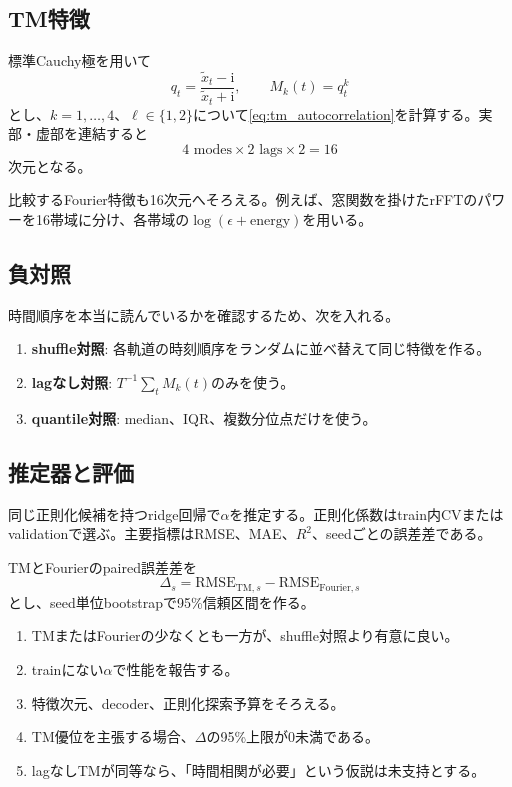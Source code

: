 \documentclass[a4paper,11pt,oneside,openany]{ltjsbook}
\newcommand{\ii}{\mathrm{i}}
\begin{document}
\subsection{TM特徴}

標準Cauchy極を用いて
\begin{equation}
  q_t=\frac{\widetilde x_t-\ii}{\widetilde x_t+\ii},
  \qquad M_k(t)=q_t^k
  \label{eq:e1_tm_modes}
\end{equation}
とし、\(k=1,\dots,4\)、\(\ell\in\{1,2\}\)について\cref{eq:tm_autocorrelation}を計算する。実部・虚部を連結すると
\begin{equation}
  4\text{ modes}\times2\text{ lags}\times2
  =16
  \label{eq:e1_tm_dim}
\end{equation}
次元となる。

比較するFourier特徴も16次元へそろえる。例えば、窓関数を掛けたrFFTのパワーを16帯域に分け、各帯域の\(\log(\epsilon+\text{energy})\)を用いる。

\subsection{負対照}

時間順序を本当に読んでいるかを確認するため、次を入れる。

\begin{enumerate}
  \item \textbf{shuffle対照}: 各軌道の時刻順序をランダムに並べ替えて同じ特徴を作る。
  \item \textbf{lagなし対照}: \(T^{-1}\sum_tM_k(t)\)のみを使う。
  \item \textbf{quantile対照}: median、IQR、複数分位点だけを使う。
\end{enumerate}

\subsection{推定器と評価}

同じ正則化候補を持つridge回帰で\(\alpha\)を推定する。正則化係数はtrain内CVまたはvalidationで選ぶ。主要指標はRMSE、MAE、\(R^2\)、seedごとの誤差差である。

TMとFourierのpaired誤差差を
\begin{equation}
  \Delta_s
  =\mathrm{RMSE}_{\mathrm{TM},s}
   -\mathrm{RMSE}_{\mathrm{Fourier},s}
  \label{eq:paired_rmse_difference}
\end{equation}
とし、seed単位bootstrapで95\%信頼区間を作る。

\begin{gatebox}
\begin{enumerate}
  \item TMまたはFourierの少なくとも一方が、shuffle対照より有意に良い。
  \item trainにない\(\alpha\)で性能を報告する。
  \item 特徴次元、decoder、正則化探索予算をそろえる。
  \item TM優位を主張する場合、\(\Delta\)の95\%上限が0未満である。
  \item lagなしTMが同等なら、「時間相関が必要」という仮説は未支持とする。
\end{enumerate}
\end{gatebox}
\end{document}
